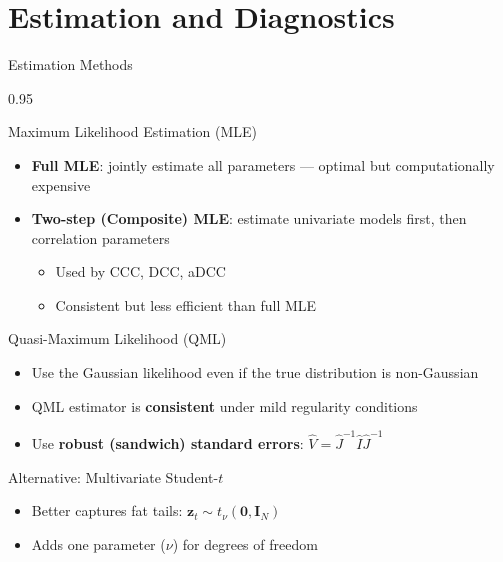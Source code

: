 \documentclass[9pt, aspectratio=169, t]{beamer}
\begin{document}
\section{Estimation and Diagnostics}

\begin{frame}{Estimation Methods}
    \begin{cminipage}{0.95\textwidth}
    \vspace{-3mm}
    {\footnotesize
    \begin{block}{Maximum Likelihood Estimation (MLE)}
        \begin{itemize}\setlength{\itemsep}{0pt}
            \item \textbf{Full MLE}: jointly estimate all parameters --- optimal but computationally expensive
            \item \textbf{Two-step (Composite) MLE}: estimate univariate models first, then correlation parameters
                \begin{itemize}\setlength{\itemsep}{0pt}
                    \item Used by CCC, DCC, aDCC
                    \item Consistent but less efficient than full MLE
                \end{itemize}
        \end{itemize}
    \end{block}
    \begin{block}{Quasi-Maximum Likelihood (QML)}
        \begin{itemize}\setlength{\itemsep}{0pt}
            \item Use the Gaussian likelihood even if the true distribution is non-Gaussian
            \item QML estimator is \textbf{consistent} under mild regularity conditions
            \item Use \textbf{robust (sandwich) standard errors}: $\hat{V} = \hat{J}^{-1}\hat{I}\hat{J}^{-1}$
        \end{itemize}
    \end{block}
    \begin{block}{Alternative: Multivariate Student-$t$}
        \begin{itemize}\setlength{\itemsep}{0pt}
            \item Better captures fat tails: $\mathbf{z}_t \sim t_\nu(\mathbf{0}, \mathbf{I}_N)$
            \item Adds one parameter ($\nu$) for degrees of freedom
        \end{itemize}
    \end{block}
    }
    \end{cminipage}
\end{frame}
\end{document}
